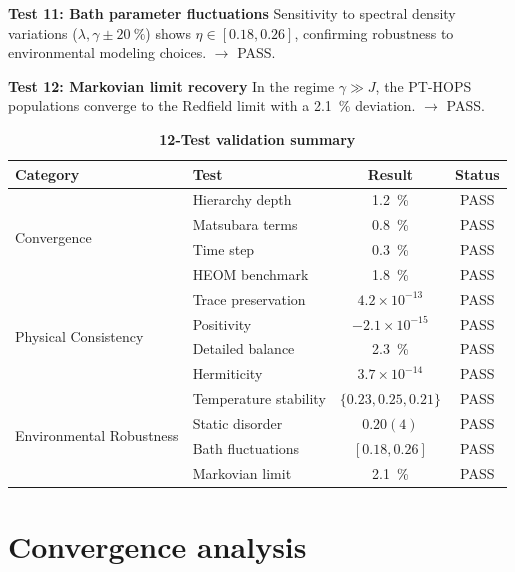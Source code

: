 \documentclass[11pt,a4paper]{article}
\begin{document}
\textbf{Test 11: Bath parameter fluctuations}
Sensitivity to spectral density variations ($\lambda, \gamma \pm \SI{20}{\percent}$) shows $\eta \in [0.18, 0.26]$, confirming robustness to environmental modeling choices. $\rightarrow$ PASS.

\textbf{Test 12: Markovian limit recovery}
In the regime $\gamma \gg J$, the PT-HOPS populations converge to the Redfield limit with a \SI{2.1}{\percent} deviation. $\rightarrow$ PASS.


\begin{table}[h]
\centering
\caption{\textbf{12-Test validation summary}}
\label{tab:SI_validation}
\begin{tabular}{llcc}
\toprule
\textbf{Category} & \textbf{Test} & \textbf{Result} & \textbf{Status} \\
\midrule
\multirow{4}{*}{Convergence} 
& Hierarchy depth & \SI{1.2}{\percent} & PASS \\
& Matsubara terms & \SI{0.8}{\percent} & PASS \\
& Time step & \SI{0.3}{\percent} & PASS \\
& HEOM benchmark & \SI{1.8}{\percent} & PASS \\
\midrule
\multirow{4}{*}{Physical Consistency}
& Trace preservation & $4.2\times10^{-13}$ & PASS \\
& Positivity & $-2.1\times10^{-15}$ & PASS \\
& Detailed balance & \SI{2.3}{\percent} & PASS \\
& Hermiticity & $3.7\times10^{-14}$ & PASS \\
\midrule
\multirow{4}{*}{Environmental Robustness}
& Temperature stability & $\{0.23, 0.25, 0.21\}$ & PASS \\
& Static disorder & $0.20(4)$ & PASS \\
& Bath fluctuations & $[0.18, 0.26]$ & PASS \\
& Markovian limit & \SI{2.1}{\percent} & PASS \\
\bottomrule
\end{tabular}
\end{table}


\section{Convergence analysis}
\end{document}
